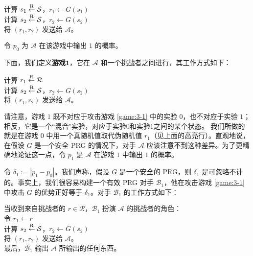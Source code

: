 \hspace*{5pt} 计算 $s_1\overset{\rm R}\leftarrow\mathcal S$，$r_1\leftarrow G(s_1)$\\
\hspace*{26pt} 计算 $s_2\overset{\rm R}\leftarrow\mathcal S$，$r_2\leftarrow G(s_2)$\\
\hspace*{26pt} 将 $(r_1,r_2)$ 发送给 $\mathcal A$。

\vspace*{5pt}

\noindent
令 $p_0$ 为 $\mathcal A$ 在该游戏中输出 $1$ 的概率。

下面，我们定义\textbf{游戏$\mathbf{1}$}，它在 $\mathcal A$ 和一个挑战者之间进行，其工作方式如下：

\vspace*{5pt}

\hspace*{2pt} \colorbox{gray!50}{计算 $r_1\overset{\rm R}\leftarrow\mathcal R$}\\
\hspace*{26pt} 计算 $s_2\overset{\rm R}\leftarrow\mathcal S$，$r_2\leftarrow G(s_2)$\\
\hspace*{26pt} 将 $(r_1,r_2)$ 发送给 $\mathcal A$。

\vspace*{5pt}

\noindent
请注意，游戏 $1$ 既不对应于攻击游戏 \ref{game:3-1} 中的实验 $0$，也不对应于实验 $1$；相反，它是一个``混合"实验，对应于实验$0$和实验$1$之间的某个状态。 我们所做的就是在游戏 $0$ 中用一个真随机值取代伪随机值 $r_1$（见上面的高亮行）。直观地说，在假设 $G$ 是一个安全 PRG 的情况下，对手 $\mathcal A$ 应该注意不到这种差异。为了更精确地论证这一点，令 $p_1$ 是 $\mathcal A$ 在游戏 $1$ 中输出 $1$ 的概率。

令 $\delta_1:=|p_1-p_0|$。我们声称，假设 $G$ 是一个安全的 PRG，则 $\delta_1$ 是可忽略不计的。事实上，我们很容易构建一个有效 PRG 对手 $\mathcal B_1$，他在攻击游戏 \ref{game:3-1} 中攻击 $G$ 的优势正好等于 $\delta_1$。对手 $\mathcal B_1$ 的工作方式如下：

\vspace*{5pt}

\hspace*{5pt} 当收到来自挑战者的 $r\in\mathcal R$，$\mathcal B_1$ 扮演 $\mathcal A$ 的挑战者的角色：\\
\hspace*{50pt} 令 $r_1\leftarrow r$\\
\hspace*{50pt} 计算 $s_2\overset{\rm R}\leftarrow\mathcal S$，$r_2\leftarrow G(s_2)$\\
\hspace*{50pt} 将 $(r_1,r_2)$ 发送给 $\mathcal A$。\\
\hspace*{26pt} 最后，$\mathcal B_1$ 输出 $\mathcal A$ 所输出的任何东西。


